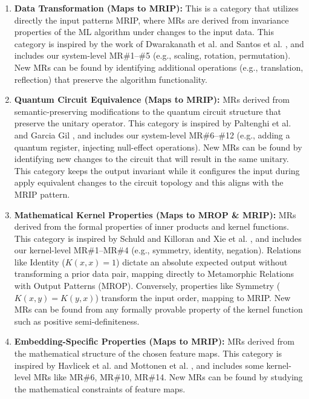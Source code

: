 \documentclass[12pt,a4paper]{article}
\begin{document}
	\begin{enumerate}
		\item \textbf{Data Transformation (Maps to MRIP):} This is a category that utilizes directly the input patterns MRIP, where MRs are derived from invariance properties of the
		ML algorithm under changes to the input data. This category
		is inspired by the work of Dwarakanath et al. \cite{Dwarakanath2018} and Santos
		et al. \cite{ssantos2020}, and includes our system-level MR\#1--\#5 (e.g., scaling,
		rotation, permutation). New MRs can be found by identifying additional
		operations (e.g., translation, reflection) that preserve the algorithm functionality.
		
		\item \textbf{Quantum Circuit Equivalence (Maps to MRIP):} MRs derived from semantic-preserving
		modifications to the quantum circuit structure that preserve the unitary operator.
		This category is inspired by Paltenghi et al. \cite{Paltenghi2023} and Garcia
		Gil \cite{gracia2024}, and includes our system-level MR\#6--\#12 (e.g., adding a
		quantum register, injecting null-effect operations). New MRs can be found by
		identifying new changes to the circuit that will result in the same unitary. This category keeps the output invariant while it configures the input during apply equivalent changes to the circuit topology and this aligns with the MRIP pattern.
		
		\item \textbf{Mathematical Kernel Properties (Maps to MROP \& MRIP):} MRs derived from the formal properties of inner products and kernel functions. This category is inspired by
		Schuld and Killoran \cite{schuld2019} and Xie et al. \cite{xie2011}, and includes
		our kernel-level MR\#1--MR\#4 (e.g., symmetry, identity, negation). Relations like Identity ($K(x,x) = 1$) dictate an absolute expected output without transforming a prior data pair, mapping directly to Metamorphic Relations with Output Patterns (MROP). Conversely, properties like Symmetry ($K(x,y) = K(y,x)$) transform the input order, mapping to MRIP. New MRs can be found from any formally provable property of the kernel function such as positive semi-definiteness.
		
		\item \textbf{Embedding-Specific Properties (Maps to MRIP):} MRs derived from the mathematical
		structure of the chosen feature maps. This category is inspired by Havlicek et al. \cite{havlicek2019} and Mottonen et al. \cite{mottonen2004}, and includes some kernel-level MRs like MR\#6, MR\#10, MR\#14. New MRs can be found by studying the mathematical constraints of feature maps.

	\end{enumerate}
	
\end{document}
